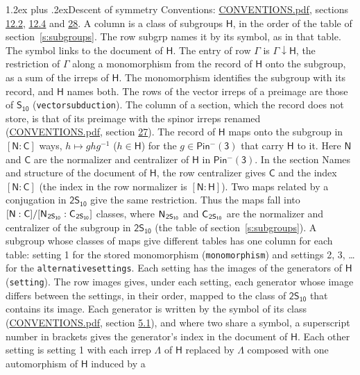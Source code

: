 \documentclass[10pt,a4paper]{article}
\makeatletter
\renewcommand\section{\@startsection{section}{1}{\z@}{-3ex plus -1ex minus -.2ex}%
  {1.2ex plus .2ex}{\normalfont\large\sffamily\bfseries\color{parttitle}}}
\numberwithin{equation}{section}
\newcommand{\grp}[1]{\mathsf{#1}}
\newcommand{\grpindex}[2]{[#1 : #2]}
\newcommand{\restr}[2]{#1\!\downarrow#2}
\newcommand{\hairsp}{\mkern1mu}
\makeatother
\begin{document}
\section{Descent of symmetry}\label{s:subduction}
Conventions: \href{../../CONVENTIONS.pdf}{CONVENTIONS.pdf}, sections \href{../../../rotation/CONVENTIONS.pdf\#conv.12.2}{12.2}, \href{../../../rotation/CONVENTIONS.pdf\#conv.12.4}{12.4} and \href{../../CONVENTIONS.pdf\#conv.28}{28}.
A column is a class of subgroups $\grp{H}$, in the order of the table of section~\ref{s:subgroups}. The row subgrp names it by its symbol, as in that table. The symbol links to the document of $\grp{H}$. The entry of row $\Gamma$ is $\restr{\Gamma}{\grp{H}}$, the restriction of $\Gamma$ along a monomorphism from the record of $\grp{H}$ onto the subgroup, as a sum of the irreps of $\grp{H}$. The monomorphism identifies the subgroup with its record, and $\grp{H}$ names both. The rows of the vector irreps of a preimage are those of \href{../../../rotation/data/pdf/S10.pdf}{$\grp{S_{10}}$} (\texttt{vectorsubduction}). The column of a section, which the record does not store, is that of its preimage with the spinor irreps renamed (\href{../../CONVENTIONS.pdf}{CONVENTIONS.pdf}, section \href{../../CONVENTIONS.pdf\#conv.27}{27}). \label{n:group.normalizer.o3}\label{n:group.centralizer.o3}\label{n:element.h}The record of $\grp{H}$ maps onto the subgroup in $\grpindex{\grp{N}}{\grp{C}}$ ways, $h \mapsto g h g^{-1}$ ($h \in \grp{H}$) for the $g \in \grp{Pin^{-}(3)}$ that carry $\grp{H}$ to it. Here $\grp{N}$ and $\grp{C}$ are the normalizer and centralizer of $\grp{H}$ in \href{Pinminus3.pdf}{$\grp{Pin^{-}(3)}$}. In the section Names and structure of the document of $\grp{H}$, the row centralizer gives $\grp{C}$ and the index $\grpindex{\grp{N}}{\grp{C}}$ (the index in the row normalizer is $\grpindex{\grp{N}}{\grp{H}}$). Two maps related by a conjugation in $\grp{2S_{10}}$ give the same restriction. Thus the maps fall into $\grpindex{\grp{N}}{\grp{C}}/\grpindex{\grp{N}_{\hairsp \grp{2S_{10}}}}{\grp{C}_{\hairsp \grp{2S_{10}}}}$ classes, where $\grp{N}_{\hairsp \grp{2S_{10}}}$ and $\grp{C}_{\hairsp \grp{2S_{10}}}$ are the normalizer and centralizer of the subgroup in $\grp{2S_{10}}$ (the table of section~\ref{s:subgroups}). \label{n:head.setting}A subgroup whose classes of maps give different tables has one column for each table: setting 1 for the stored monomorphism (\texttt{monomorphism}) and settings 2, 3, \dots{} for the \texttt{alternativesettings}. Each setting has the images of the generators of $\grp{H}$ (\texttt{setting}). \label{n:head.images}The row images gives, under each setting, each generator whose image differs between the settings, in their order, mapped to the class of $\grp{2S_{10}}$ that contains its image. Each generator is written by the symbol of its class (\href{../../CONVENTIONS.pdf}{CONVENTIONS.pdf}, section \href{../../../rotation/CONVENTIONS.pdf\#conv.5.1}{5.1}), and where two share a symbol, a superscript number in brackets gives the generator's index in the document of $\grp{H}$. \label{n:irrep.Delta}Each other setting is setting 1 with each irrep $\Lambda$ of $\grp{H}$ replaced by $\Lambda$ composed with one automorphism of $\grp{H}$ induced by a 
\end{document}
